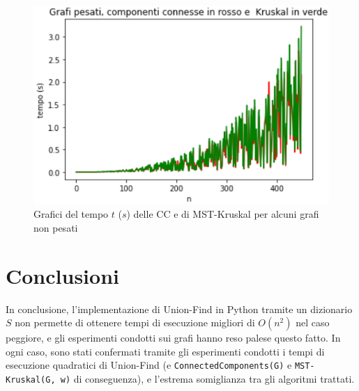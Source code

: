 \documentclass[]{article}
\def\code#1{\texttt{#1}} %
\begin{document}
\begin{figure}[H]
\centering
\includegraphics[width=.7\textwidth, height=.6\textheight, keepaspectratio]{GraficoGrafiPesatiCCeK}
\caption{Grafici del tempo $t$ ($s$) delle CC e di MST-Kruskal per alcuni grafi non pesati}
\label{fig:fig4}
\end{figure}


\section {Conclusioni}
In conclusione, l'implementazione di Union-Find in Python tramite un dizionario $S$ non permette di ottenere tempi di esecuzione migliori di $O(n^2)$ nel caso peggiore, e gli esperimenti condotti sui grafi hanno reso palese questo fatto. In ogni caso, sono stati confermati tramite gli esperimenti condotti i tempi di esecuzione quadratici di Union-Find (e \code{ConnectedComponents(G)} e \code{MST-Kruskal(G, w)} di conseguenza), e l'estrema somiglianza tra gli algoritmi trattati.
\end{document}
